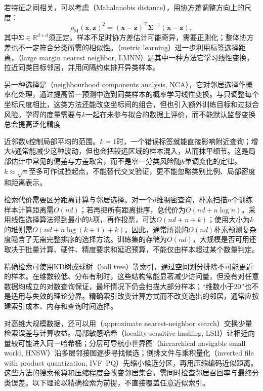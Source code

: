 若特征之间相关，可以考虑（Mahalanobis distance），用协方差调整方向上的尺度：
\begin{equation}
  \rho_{\mathrm{M}}(\bm{x},\bm{z})^2
  =(\bm{x}-\bm{z})^\top
   \bm{\Sigma}^{-1}(\bm{x}-\bm{z}),
  \label{eq:classification-mahalanobis}
\end{equation}
其中$\bm{\Sigma}\in\mathbb{R}^{d\times d}$须正定。样本不足时协方差估计可能奇异，需要正则化；整体协方差也不一定符合分类所需的相似性。（metric learning）进一步利用标签选择距离，（large margin nearest neighbor, LMNN）是其中一种方法它学习线性变换，拉近同类目标邻居，并用间隔约束排开异类样本。

另一种选择是（neighbourhood components analysis, NCA），它对邻居选择作概率化处理，通过提高留一预测中选到同类样本的概率学习线性变换。与只调整每个坐标尺度相比，这类方法还能改变坐标间的组合，但也引入额外训练目标和过拟合风险。学得的度量需要与$k$一起在未参与拟合的数据上评价，而不能默认监督变换总会提高泛化精度

近邻数$k$控制局部平均的范围。$k=1$时，一个错误标签就能直接影响附近查询；增大$k$通常能减少这种波动，但也会把较远区域的样本混入，从而抹平细节。这是局部估计中常见的偏差与方差取舍，而不是零一分类风险随$k$单调变化的定律。$k\approx\sqrt n$至多可作试验起点，不能替代交叉验证，更不能忽略类别比例、局部密度和距离表示。

检索代价需要区分距离计算与邻居选择。对一个$d$维稠密查询，朴素扫描$n$个训练样本计算距离需$O(nd)$；若再把所有距离排序，总代价为$O(nd+n\log n)$。采用线性选择算法得到最小的$k$项，再作投票，可达$O(nd+n+k)$；使用大小为$k$的堆则需$O(nd+n\log(k+1)+k)$。因此，通常所说的$O(nd)$朴素预测复杂度隐含了无需完整排序的选择方法。训练集的存储为$O(nd)$，大规模是否可用还取决于批量计算、硬件、精度要求和延迟预算，不能仅由样本超过某个数量判定。

精确检索可使用KD树或球树（ball tree）等索引，通过空间划分排除不可能更近的样本。在维数较低、分布有利时，这些结构常能显著减少访问量，但没有对任意数据均成立的对数查询保证，最坏情况下仍会扫描大部分样本；“维数小于20”也不是适用与失效的理论分界。精确索引改变计算方式而不改变选出的邻居，通常应按建索引成本、内存和查询时间选择。

对高维大规模数据，还可以用（approximate nearest-neighbor search）交换少量检索误差与计算收益。局部敏感哈希（locality-sensitive hashing, LSH）让相近向量较可能进入同一哈希桶；分层可导航小世界图（hierarchical navigable small world, HNSW）沿多层邻接图逐步寻找候选；倒排文件与乘积量化（inverted file with product quantization, IVF--PQ）先缩小候选分区，再用压缩编码近似距离。这些方法的搜索预算和压缩程度会改变邻居集合，需同时检查邻居召回率与最终分类误差。以下理论以精确检索为前提，不直接覆盖任意近似索引。


